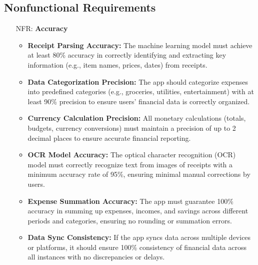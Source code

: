 \documentclass[12pt]{article}
\newcounter{frnum} %
\newcounter{nfrnum} %
\begin{document}
\newpage

\subsection{Nonfunctional Requirements}

\noindent \begin{itemize}

\item[NFR\refstepcounter{nfrnum}\thenfrnum \label{NFR_Accuracy}:] \textbf{Accuracy}
	\begin{itemize}
		\item \textbf{Receipt Parsing Accuracy:} The machine learning model must achieve at least 80\% accuracy in correctly identifying and extracting key information (e.g., item names, prices, dates) from receipts.
		\item \textbf{Data Categorization Precision:} The app should categorize expenses into predefined categories (e.g., groceries, utilities, entertainment) with at least 90\% precision to ensure users' financial data is correctly organized.
		\item \textbf{Currency Calculation Precision:} All monetary calculations (totals, budgets, currency conversions) must maintain a precision of up to 2 decimal places to ensure accurate financial reporting.
		\item \textbf{OCR Model Accuracy:} The optical character recognition (OCR) model must correctly recognize text from images of receipts with a minimum accuracy rate of 95\%, ensuring minimal manual corrections by users.
		\item \textbf{Expense Summation Accuracy:} The app must guarantee 100\% accuracy in summing up expenses, incomes, and savings across different periods and categories, ensuring no rounding or summation errors.
		\item \textbf{Data Sync Consistency:} If the app syncs data across multiple devices or platforms, it should ensure 100\% consistency of financial data across all instances with no discrepancies or delays.
	\end{itemize}

\newpage


\end{itemize}
\end{document}

